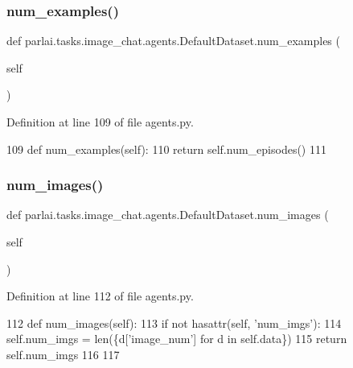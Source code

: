 \subsubsection{\texorpdfstring{num\+\_\+examples()}{num\_examples()}}
{\footnotesize\ttfamily def parlai.\+tasks.\+image\+\_\+chat.\+agents.\+Default\+Dataset.\+num\+\_\+examples (\begin{DoxyParamCaption}\item[{}]{self }\end{DoxyParamCaption})}



Definition at line 109 of file agents.\+py.


\begin{DoxyCode}
109     \textcolor{keyword}{def }num\_examples(self):
110         \textcolor{keywordflow}{return} self.num\_episodes()
111 
\end{DoxyCode}
\mbox{\label{classparlai_1_1tasks_1_1image__chat_1_1agents_1_1DefaultDataset_aa926ef2ab5deb252b7ee8b6023c8ae7b}} 
\subsubsection{\texorpdfstring{num\+\_\+images()}{num\_images()}}
{\footnotesize\ttfamily def parlai.\+tasks.\+image\+\_\+chat.\+agents.\+Default\+Dataset.\+num\+\_\+images (\begin{DoxyParamCaption}\item[{}]{self }\end{DoxyParamCaption})}



Definition at line 112 of file agents.\+py.


\begin{DoxyCode}
112     \textcolor{keyword}{def }num\_images(self):
113         \textcolor{keywordflow}{if} \textcolor{keywordflow}{not} hasattr(self, \textcolor{stringliteral}{'num\_imgs'}):
114             self.num\_imgs = len(\{d[\textcolor{stringliteral}{'image\_num'}] \textcolor{keywordflow}{for} d \textcolor{keywordflow}{in} self.data\})
115         \textcolor{keywordflow}{return} self.num\_imgs
116 
117 
\end{DoxyCode}


